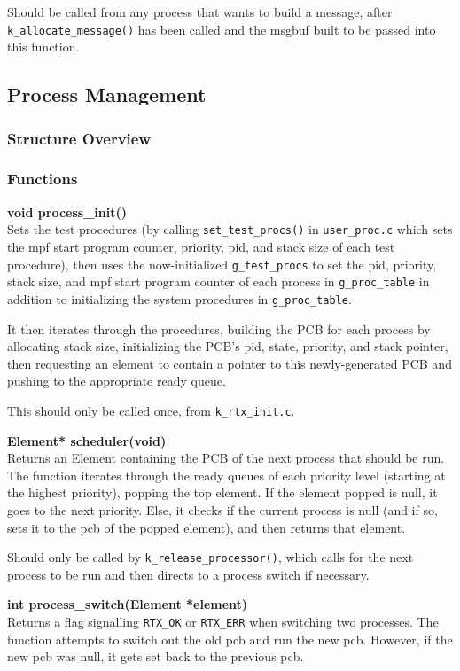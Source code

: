 \documentclass[11pt, oneside]{article}
\begin{document}
Should be called from any process that wants to build a message, after {\tt k\_allocate\_message()} has been called and the msgbuf built to be passed into this function.

\subsection{Process Management}
\subsubsection{Structure Overview}


\subsubsection{Functions}
{\bf void process\_init()}\\
Sets the test procedures (by calling {\tt set\_test\_procs()} in {\tt user\_proc.c} which sets the mpf start program counter, priority, pid, and stack size of each test procedure), then uses the now-initialized {\tt g\_test\_procs} to set the pid, priority, stack size, and mpf start program counter of each process in {\tt g\_proc\_table} in addition to initializing the system procedures in {\tt g\_proc\_table}.

It then iterates through the procedures, building the PCB for each process by allocating stack size, initializing the PCB's pid, state, priority, and stack pointer, then requesting an element to contain a pointer to this newly-generated PCB and pushing to the appropriate ready queue.

This should only be called once, from {\tt k\_rtx\_init.c}.

{\bf Element* scheduler(void)}\\
Returns an Element containing the PCB of the next process that should be run. The function iterates through the ready queues of each priority level (starting at the highest priority), popping the top element. If the element popped is null, it goes to the next priority. Else, it checks if the current process is null (and if so, sets it to the pcb of the popped element), and then returns that element.

Should only be called by {\tt k\_release\_processor()}, which calls for the next process to be run and then directs to a process switch if necessary.

{\bf int process\_switch(Element *element)}\\
Returns a flag signalling {\tt RTX\_OK} or {\tt RTX\_ERR} when switching two processes. The function attempts to switch out the old pcb and run the new pcb. However, if the new pcb was null, it gets set back to the previous pcb.
\end{document}
